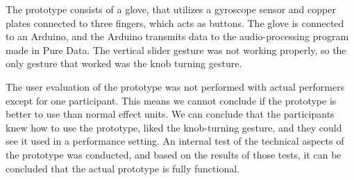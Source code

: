 The prototype consists of a glove, that utilizes a gyroscope sensor and copper plates connected to three fingers, which acts as buttons. The glove is connected to an Arduino, and the Arduino transmits data to the audio-processing program made in Pure Data. The vertical slider gesture was not working properly, so the only gesture that worked was the knob turning gesture.

The user evaluation of the prototype was not performed with actual performers except for one participant. This means we cannot conclude if the prototype is better to use than normal effect units. We can conclude that the participants knew how to use the prototype, liked the knob-turning gesture, and they could see it used in a performance setting. An internal test of the technical aspects of the prototype was conducted, and based on the results of those tests, it can be concluded that the actual prototype is fully functional.